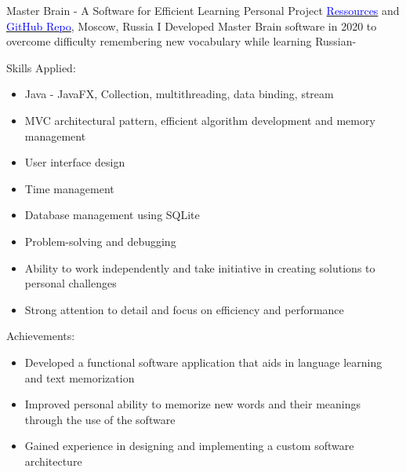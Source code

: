 \vspace{2mm}

    {Master Brain - A Software for Efficient Learning}
    {Personal Project}
    {\href{https://disk.yandex.ru/d/T0gdYBeMfautMg}{\textcolor{blue}{Ressources}} and 
    \href{https://github.com/DanGlChris/Master-Brain}{\textcolor{blue}{GitHub Repo}}, 
    Moscow, Russia
    }
    {
    \newline
    I Developed Master Brain software in 2020 to overcome difficulty remembering new vocabulary while learning Russian- }
    {
    Skills Applied:
    \begin{itemize}
        \item Java - JavaFX,  Collection, multithreading, data binding, stream
        \item MVC architectural pattern, efficient algorithm development and memory management
        \item User interface design
        \item Time management
        \item Database management using SQLite
        \item Problem-solving and debugging
        \item Ability to work independently and take initiative in creating solutions to personal challenges
        \item Strong attention to detail and focus on efficiency and performance
    \end{itemize}
    Achievements:
    \begin{itemize}
        \item Developed a functional software application that aids in language learning and text memorization
        \item Improved personal ability to memorize new words and their meanings through the use of the software
        \item Gained experience in designing and implementing a custom software architecture
    \end{itemize}
    }

\vspace{2mm}

